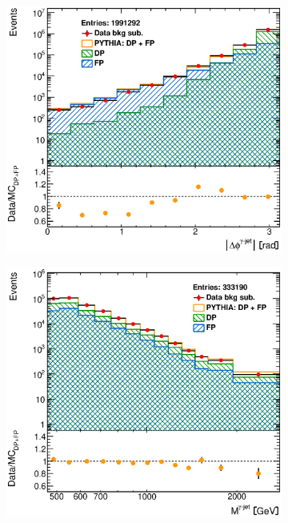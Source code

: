 \documentclass[12pt, twoside]{article}
\numberwithin{equation}{section}
\numberwithin{figure}{section}
\newenvironment{changemargin}[2]{%
\begin{list}{}{%
\setlength{\topsep}{0pt}%
\setlength{\leftmargin}{#1}%
\setlength{\rightmargin}{#2}%
\setlength{\listparindent}{\parindent}%
\setlength{\itemindent}{\parindent}%
\setlength{\parsep}{\parskip}%
}%
\item[]}{\end{list}}
\begin{document}
\begin{figure}
\begin{changemargin}{-1.0cm}{-0.75cm}
\begin{changemargin}{-0.75cm}{-1.0cm}
        \vspace{0.2cm}
        \begin{subfigure}[b]{0.37\textwidth}
            \includegraphics[width=\textwidth]{./images/BackgroundSubtractedPythia/SIG_EVENTS-107.eps}
            \subcaption{}
            \label{fig:BSDeltaPhiPhotonJetPYTHIA}
        \end{subfigure}
        \begin{subfigure}[b]{0.37\textwidth}
            \includegraphics[width=\textwidth]{./images/BackgroundSubtractedPythia/SIG_EVENTS-108.eps}

\end{subfigure}
\end{changemargin}
\end{changemargin}
\end{figure}
\end{document}
